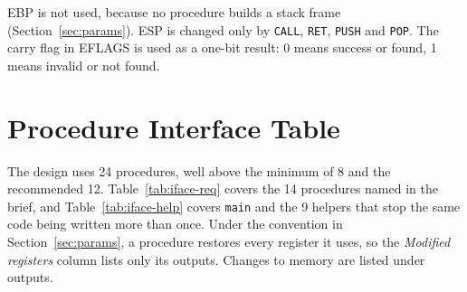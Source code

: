 \documentclass{thesis-library}
\begin{document}
EBP is not used, because no procedure builds a stack frame (Section~\ref{sec:params}). ESP is changed only by \texttt{CALL}, \texttt{RET}, \texttt{PUSH} and \texttt{POP}. The carry flag in EFLAGS is used as a one-bit result: 0 means success or found, 1 means invalid or not found.



\section{Procedure Interface Table}

The design uses 24 procedures, well above the minimum of 8 and the recommended 12. Table~\ref{tab:iface-req} covers the 14 procedures named in the brief, and Table~\ref{tab:iface-help} covers \texttt{main} and the 9 helpers that stop the same code being written more than once. Under the convention in Section~\ref{sec:params}, a procedure restores every register it uses, so the \emph{Modified registers} column lists only its outputs. Changes to memory are listed under outputs.
\end{document}
